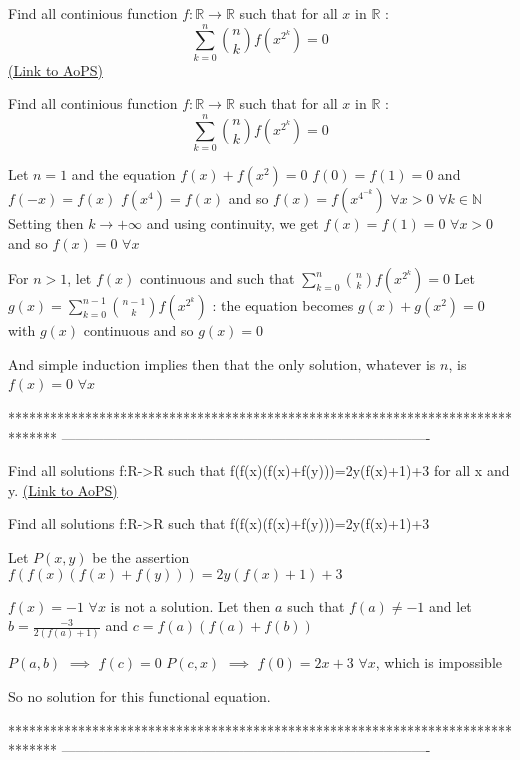 \begin{problem}
	Find all continious function $f:\mathbb{R}\to \mathbb{R}$ such that for all $x$ in $\mathbb{R}$ : 
\[\sum_{k=0}^{n}\binom{n}{k}f(x^{2^{k}})=0\]
	\flushright \href{https://artofproblemsolving.com/community/c6h530057}{(Link to AoPS)}
\end{problem}



\begin{solution}
	\begin{tcolorbox}Find all continious function $f:\mathbb{R}\to \mathbb{R}$ such that for all $x$ in $\mathbb{R}$ : 
\[\sum_{k=0}^{n}\binom{n}{k}f(x^{2^{k}})=0\]\end{tcolorbox}
Let $n=1$ and the equation $f(x)+f(x^2)=0$
$f(0)=f(1)=0$ and $f(-x)=f(x)$
$f(x^4)=f(x)$ and so $f(x)=f(x^{4^{-k}})$ $\forall x>0$ $\forall k\in\mathbb N$
Setting then $k\to+\infty$ and using continuity, we get $f(x)=f(1)=0$ $\forall x>0$ and so $\boxed{f(x)=0}$ $\forall x$

For $n>1$, let $f(x)$ continuous and such that $\sum_{k=0}^n\binom nkf(x^{2^k})=0$
Let $g(x)=\sum_{k=0}^{n-1}\binom{n-1}kf(x^{2^k})$ : the equation becomes $g(x)+g(x^2)=0$ with $g(x)$ continuous and so $g(x)=0$

And simple induction implies then that the only solution, whatever is $n$, is $f(x)=0$ $\forall x$
\end{solution}
*******************************************************************************
-------------------------------------------------------------------------------

\begin{problem}
	Find all solutions f:R->R such that f(f(x)(f(x)+f(y)))=2y(f(x)+1)+3 for all x and y.
	\flushright \href{https://artofproblemsolving.com/community/c6h530193}{(Link to AoPS)}
\end{problem}



\begin{solution}
	\begin{tcolorbox}Find all solutions f:R->R such that f(f(x)(f(x)+f(y)))=2y(f(x)+1)+3\end{tcolorbox}
Let $P(x,y)$ be the assertion $f(f(x)(f(x)+f(y)))=2y(f(x)+1)+3$

$f(x)=-1$ $\forall x$ is not a solution. Let then $a$ such that $f(a)\ne -1$ and let $b=\frac{-3}{2(f(a)+1)}$ and $c=f(a)(f(a)+f(b))$

$P(a,b)$ $\implies$ $f(c)=0$
$P(c,x)$ $\implies$ $f(0)=2x+3$ $\forall x$, which is impossible

So no solution for this functional equation.
\end{solution}
*******************************************************************************
-------------------------------------------------------------------------------

